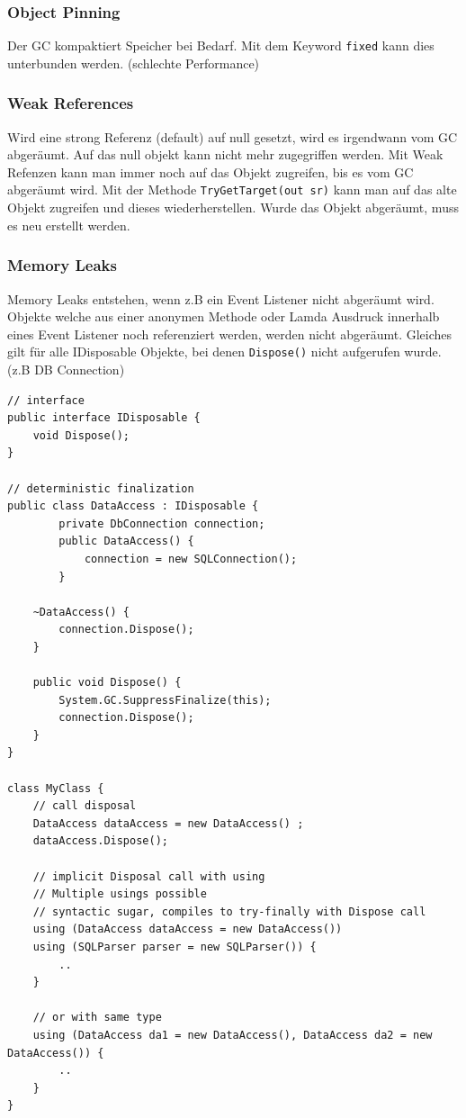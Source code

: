 \documentclass[
a4paper,
oneside,
10pt,
fleqn,
headsepline,
toc=listofnumbered, 
bibliography=totocnumbered]{scrartcl}
\begin{document}
\subsubsection{Object Pinning} Der GC kompaktiert Speicher bei Bedarf. Mit dem Keyword \lstinline|fixed| kann dies unterbunden werden. (schlechte Performance)

\subsubsection{Weak References} Wird eine strong Referenz (default) auf null gesetzt, wird es irgendwann vom GC abgeräumt. Auf das null objekt kann nicht mehr zugegriffen werden. Mit Weak Refenzen kann man immer noch auf das Objekt zugreifen, bis es vom GC abgeräumt wird. Mit der Methode \lstinline|TryGetTarget(out sr)| kann man auf das alte Objekt zugreifen und dieses wiederherstellen. Wurde das Objekt abgeräumt, muss es neu erstellt werden.

\subsubsection{Memory Leaks} Memory Leaks entstehen, wenn z.B ein Event Listener nicht abgeräumt wird. Objekte welche aus einer anonymen Methode oder Lamda Ausdruck innerhalb eines Event Listener noch referenziert werden, werden nicht abgeräumt. Gleiches gilt für alle IDisposable Objekte, bei denen \lstinline|Dispose()| nicht aufgerufen wurde. (z.B DB Connection)

\begin{lstlisting}
// interface
public interface IDisposable {
	void Dispose();
}
	
// deterministic finalization
public class DataAccess : IDisposable {
		private DbConnection connection;
		public DataAccess() {
			connection = new SQLConnection();
		}
	
	~DataAccess() {
		connection.Dispose();
	}
	
	public void Dispose() {
		System.GC.SuppressFinalize(this);
		connection.Dispose();
	}
}

class MyClass {
	// call disposal
	DataAccess dataAccess = new DataAccess() ;
	dataAccess.Dispose();
	
	// implicit Disposal call with using
	// Multiple usings possible
	// syntactic sugar, compiles to try-finally with Dispose call
	using (DataAccess dataAccess = new DataAccess())
	using (SQLParser parser = new SQLParser()) {
		..
	}
	
	// or with same type
	using (DataAccess da1 = new DataAccess(), DataAccess da2 = new DataAccess()) {
		..
	}
}
\end{lstlisting}
\end{document}
